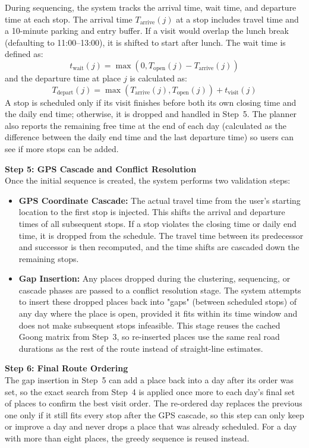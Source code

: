 \documentclass[a4paper,12pt]{report}
\begin{document}
During sequencing, the system tracks the arrival time, wait time, and departure time at each stop. The arrival time $T_{\text{arrive}}(j)$ at a stop includes travel time and a 10-minute parking and entry buffer. If a visit would overlap the lunch break (defaulting to 11:00--13:00), it is shifted to start after lunch. The wait time is defined as:
\[
t_{\text{wait}}(j) = \max(0, T_{\text{open}}(j) - T_{\text{arrive}}(j))
\]
and the departure time at place $j$ is calculated as:
\[
T_{\text{depart}}(j) = \max(T_{\text{arrive}}(j), T_{\text{open}}(j)) + t_{\text{visit}}(j)
\]
A stop is scheduled only if its visit finishes before both its own closing time and the daily end time; otherwise, it is dropped and handled in Step~5. The planner also reports the remaining free time at the end of each day (calculated as the difference between the daily end time and the last departure time) so users can see if more stops can be added.

\textbf{Step 5: GPS Cascade and Conflict Resolution}
\\ Once the initial sequence is created, the system performs two validation steps:
\begin{itemize}
    \item \textbf{GPS Coordinate Cascade:} The actual travel time from the user's starting location to the first stop is injected. This shifts the arrival and departure times of all subsequent stops. If a stop violates the closing time or daily end time, it is dropped from the schedule. The travel time between its predecessor and successor is then recomputed, and the time shifts are cascaded down the remaining stops.
    \item \textbf{Gap Insertion:} Any places dropped during the clustering, sequencing, or cascade phases are passed to a conflict resolution stage. The system attempts to insert these dropped places back into "gaps" (between scheduled stops) of any day where the place is open, provided it fits within its time window and does not make subsequent stops infeasible. This stage reuses the cached Goong matrix from Step~3, so re-inserted places use the same real road durations as the rest of the route instead of straight-line estimates.
\end{itemize}

\textbf{Step 6: Final Route Ordering}
\\ The gap insertion in Step~5 can add a place back into a day after its order was set, so the exact search from Step~4 is applied once more to each day's final set of places to confirm the best visit order. The re-ordered day replaces the previous one only if it still fits every stop after the GPS cascade, so this step can only keep or improve a day and never drops a place that was already scheduled. For a day with more than eight places, the greedy sequence is reused instead.
\end{document}
